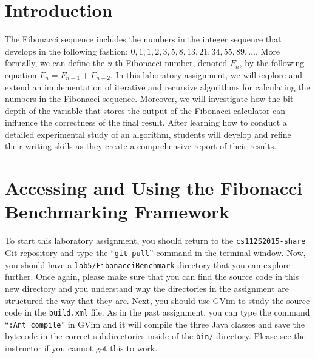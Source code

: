 


\usepackage[compact]{titlesec}


\section*{Introduction}

The Fibonacci sequence includes the numbers in the integer sequence that develops in the following fashion: $0, 1, 1,
2, 3, 5, 8, 13, 21, 34, 55, 89, \ldots$. More formally, we can define the {\em n}-th Fibonacci number, denoted $F_n$,
by the following equation $F_n = F_{n-1} + F_{n-2}$. In this laboratory assignment, we will explore and
extend an implementation of iterative and recursive algorithms for calculating the numbers in the Fibonacci sequence.
Moreover, we will investigate how the bit-depth of the variable that stores the output of the Fibonacci calculator can
influence the correctness of the final result. After learning how to conduct a detailed experimental study of an
algorithm, students will develop and refine their writing skills as they create a comprehensive report of their results.

\section*{Accessing and Using the Fibonacci Benchmarking Framework}

\begin{sloppypar} To start this laboratory assignment, you should return to the {\tt cs112S2015-share} Git repository
  and type the ``{\tt git pull}'' command in the terminal window.  Now, you should have a {\tt lab5/FibonacciBenchmark}
  directory that you can explore further.  Once again, please make sure that you can find the source code in this new
  directory and you understand why the directories in the assignment are structured the way that they are. Next, you
  should use GVim to study the source code in the {\tt build.xml} file.  As in the past assignment, you can type the
  command ``{\tt :Ant compile}'' in GVim and it will compile the three Java classes and save the bytecode in the correct
  subdirectories inside of the {\tt bin/} directory.  Please see the instructor if you cannot get this to work.
\end{sloppypar}

